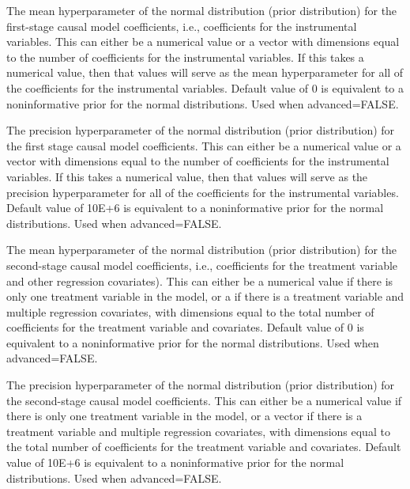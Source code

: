 \documentclass[a4paper]{book}
\begin{document}
\begin{Arguments}
\begin{ldescription}
\item[\code{b0}] The mean hyperparameter of the normal distribution (prior distribution)
for the first-stage causal model coefficients, i.e., coefficients for the instrumental variables.
This can either be a numerical value or a vector with dimensions equal to the number of coefficients
for the instrumental variables. If this takes a numerical value, then that values will
serve as the mean hyperparameter for all of the coefficients for the instrumental variables.
Default value of 0 is equivalent to a noninformative prior for the normal distributions.
Used when advanced=FALSE.

\item[\code{B0}] The precision hyperparameter of the normal distribution (prior distribution)
for the first stage causal model coefficients.
This can either be a numerical value or a vector with dimensions equal to the number of coefficients
for the instrumental variables. If this takes a numerical value, then that values will
serve as the precision hyperparameter for all of the coefficients for the instrumental variables.
Default value of 10E+6 is equivalent to a noninformative prior for the normal distributions.
Used when advanced=FALSE.

\item[\code{g0}] The mean hyperparameter of the normal distribution (prior distribution)
for the second-stage causal model coefficients,
i.e., coefficients for the treatment variable and other regression covariates).
This can either be a numerical value if there is only one treatment variable in the model,
or a if there is a treatment variable and multiple regression covariates,
with dimensions equal to the total number of coefficients for the treatment variable and covariates.
Default value of 0 is equivalent to a noninformative prior for the normal distributions.
Used when advanced=FALSE.

\item[\code{G0}] The precision hyperparameter of the normal distribution (prior distribution)
for the second-stage causal model coefficients.
This can either be a numerical value if there is only one treatment variable in the model,
or a vector if there is a treatment variable and multiple regression covariates,
with dimensions equal to the total number of coefficients for the treatment variable and covariates.
Default value of 10E+6 is equivalent to a noninformative prior for the normal distributions.
Used when advanced=FALSE.


\end{ldescription}
\end{Arguments}
\end{document}
